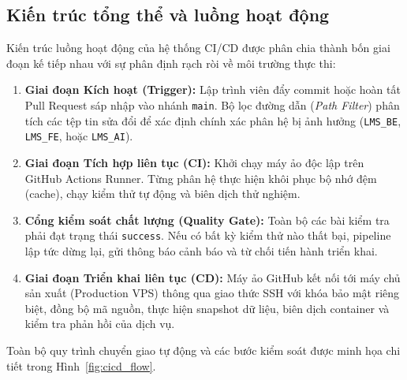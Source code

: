 \clearpage
\subsection{Kiến trúc tổng thể và luồng hoạt động}

Kiến trúc luồng hoạt động của hệ thống CI/CD được phân chia thành bốn giai đoạn kế tiếp nhau với sự phân định rạch ròi về môi trường thực thi:

\begin{enumerate}[noitemsep]
    \item \textbf{Giai đoạn Kích hoạt (Trigger):} Lập trình viên đẩy commit hoặc hoàn tất Pull Request sáp nhập vào nhánh \texttt{main}. Bộ lọc đường dẫn (\textit{Path Filter}) phân tích các tệp tin sửa đổi để xác định chính xác phân hệ bị ảnh hưởng (\texttt{LMS\_BE}, \texttt{LMS\_FE}, hoặc \texttt{LMS\_AI}).
    \item \textbf{Giai đoạn Tích hợp liên tục (CI):} Khởi chạy máy ảo độc lập trên GitHub Actions Runner. Từng phân hệ thực hiện khôi phục bộ nhớ đệm (cache), chạy kiểm thử tự động và biên dịch thử nghiệm.
    \item \textbf{Cổng kiểm soát chất lượng (Quality Gate):} Toàn bộ các bài kiểm tra phải đạt trạng thái \texttt{success}. Nếu có bất kỳ kiểm thử nào thất bại, pipeline lập tức dừng lại, gửi thông báo cảnh báo và từ chối tiến hành triển khai.
    \item \textbf{Giai đoạn Triển khai liên tục (CD):} Máy ảo GitHub kết nối tới máy chủ sản xuất (Production VPS) thông qua giao thức SSH với khóa bảo mật riêng biệt, đồng bộ mã nguồn, thực hiện snapshot dữ liệu, biên dịch container và kiểm tra phản hồi của dịch vụ.
\end{enumerate}

Toàn bộ quy trình chuyển giao tự động và các bước kiểm soát được minh họa chi tiết trong Hình~\ref{fig:cicd_flow}.

